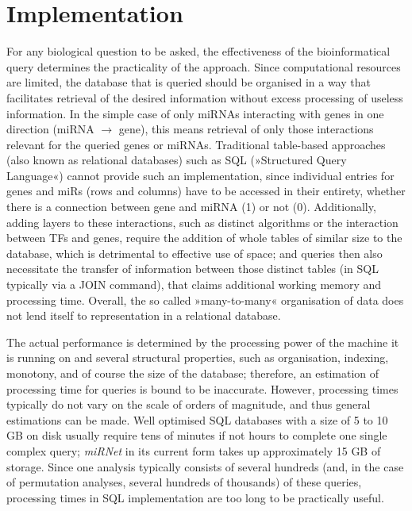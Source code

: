 \section{Implementation}
For any biological question to be asked, the effectiveness of the bioinformatical query determines the practicality of the approach. Since computational resources are limited, the database that is queried should be organised in a way that facilitates retrieval of the desired information without excess processing of useless information. In the simple case of only miRNAs interacting with genes in one direction (miRNA $\to$ gene), this means retrieval of only those interactions relevant for the queried genes or miRNAs. Traditional table-based approaches (also known as relational databases) such as SQL  (»Structured Query Language«) cannot provide such an implementation, since individual entries for genes and miRs (rows and columns) have to be accessed in their entirety, whether there is a connection between gene and miRNA (1) or not (0). Additionally, adding layers to these interactions, such as distinct algorithms or the interaction between TFs and genes, require the addition of whole tables of similar size to the database, which is detrimental to effective use of space; and queries then also necessitate the transfer of information between those distinct tables (in SQL typically via a JOIN command), that claims additional working memory and processing time. Overall, the so called »many-to-many« organisation of data does not lend itself to representation in a relational database.


The actual performance is determined by the processing power of the machine it is running on and several structural properties, such as organisation, indexing, monotony, and of course the size of the database; therefore, an estimation of processing time for queries is bound to be inaccurate. However, processing times typically do not vary on the scale of orders of magnitude, and thus general estimations can be made. Well optimised SQL databases with a size of 5 to 10 GB on disk usually require tens of minutes if not hours to complete one single complex query\cite{Chaudhuri2004}; \textit{miRNet} in its current form takes up approximately 15 GB of storage. Since one analysis typically consists of several hundreds (and, in the case of permutation analyses, several hundreds of thousands) of these queries, processing times in SQL implementation are too long to be practically useful.

